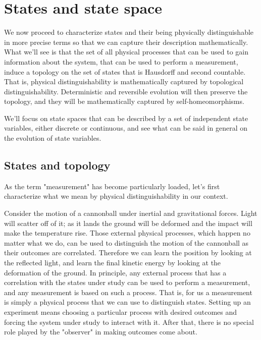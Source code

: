 \documentclass[aps,pra,10pt,twocolumn,floatfix,nofootinbib]{revtex4-1}
\theoremstyle{definition}
\begin{document}
\section{States and state space}



We now proceed to characterize states and their being physically distinguishable in more precise terms so that we can capture their description mathematically. What we'll see is that the set of all physical processes that can be used to gain information about the system, that can be used to perform a measurement, induce a topology on the set of states that is Hausdorff and second countable. That is, physical distinguishability is mathematically captured by topological distinguishability. Deterministic and reversible evolution will then preserve the topology, and they will be mathematically captured by self-homeomorphisms.

We'll focus on state spaces that can be described by a set of independent state variables, either discrete or continuous, and see what can be said in general on the evolution of state variables.

\subsection{States and topology}

As the term "measurement" has become particularly loaded, let's first characterize what we mean by physical distinguishability in our context.

Consider the motion of a cannonball under inertial and gravitational forces. Light will scatter off of it; as it lands the ground will be deformed and the impact will make the temperature rise. Those external physical processes, which happen no matter what we do, can be used to distinguish the motion of the cannonball as their outcomes are correlated. Therefore we can learn the position by looking at the reflected light, and learn the final kinetic energy by looking at the deformation of the ground. In principle, any external process that has a correlation with the states under study can be used to perform a measurement, and any measurement is based on such a process. That is, for us a measurement is simply a physical process that we can use to distinguish states. Setting up an experiment means choosing a particular process with desired outcomes and forcing the system under study to interact with it. After that, there is no special role played by the "observer" in making outcomes come about.
\end{document}
